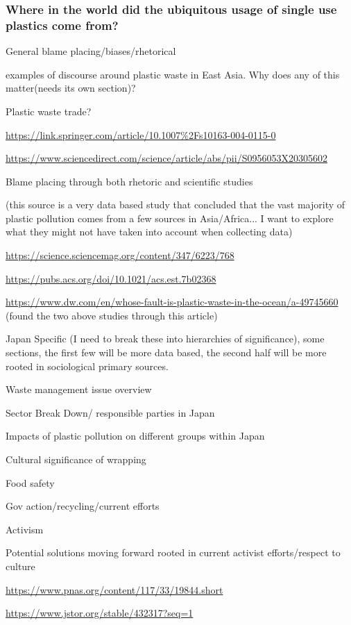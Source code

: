 \documentclass{book}\usepackage{knitr}
\begin{document}
\subsubsection{Where in the world did the ubiquitous usage of single use plastics come from?}

General blame placing/biases/rhetorical 

examples of discourse around plastic waste in East Asia. Why does any of this matter(needs its own section)?

Plastic waste trade? 

\url{https://link.springer.com/article/10.1007%2Fs10163-004-0115-0}

\url{https://www.sciencedirect.com/science/article/abs/pii/S0956053X20305602}

Blame placing through both rhetoric and scientific studies

(this source is a very data based study that concluded that the vast majority of plastic pollution comes from a few sources in Asia/Africa... I want to explore what they might not have taken into account when collecting data)

\url{https://science.sciencemag.org/content/347/6223/768}

\url{https://pubs.acs.org/doi/10.1021/acs.est.7b02368}

\url{https://www.dw.com/en/whose-fault-is-plastic-waste-in-the-ocean/a-49745660} (found the two above studies through this article)

Japan Specific (I need to break these into hierarchies of significance), some sections, the first  few will be more data based, the second half will be more rooted in sociological primary sources.

Waste management issue overview

Sector Break Down/ responsible parties in Japan

Impacts of plastic pollution on different groups within Japan

Cultural significance of wrapping

Food safety

Gov action/recycling/current efforts

Activism

Potential solutions moving forward rooted in current activist efforts/respect to culture

\url{https://www.pnas.org/content/117/33/19844.short}

\url{https://www.jstor.org/stable/432317?seq=1}
\end{document}
